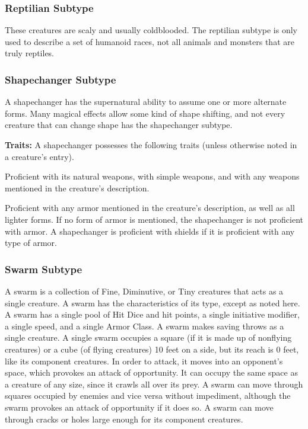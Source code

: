\subsubsection{Reptilian Subtype}
These creatures are scaly and usually coldblooded. The reptilian subtype is only used to describe a set of humanoid races, not all animals and monsters that are truly reptiles.

\subsubsection{Shapechanger Subtype}
A shapechanger has the supernatural ability to assume one or more alternate forms. Many magical effects allow some kind of shape shifting, and not every creature that can change shape has the shapechanger subtype.

\textbf{Traits:} A shapechanger possesses the following traits (unless otherwise noted in a creature's entry).
\begin{itemize*}
\item Proficient with its natural weapons, with simple weapons, and with any weapons mentioned in the creature's description.
\item Proficient with any armor mentioned in the creature's description, as well as all lighter forms. If no form of armor is mentioned, the shapechanger is not proficient with armor. A shapechanger is proficient with shields if it is proficient with any type of armor.
\end{itemize*}

\subsubsection{Swarm Subtype}
A swarm is a collection of Fine, Diminutive, or Tiny creatures that acts as a single creature. A swarm has the characteristics of its type, except as noted here. A swarm has a single pool of Hit Dice and hit points, a single initiative modifier, a single speed, and a single Armor Class. A swarm makes saving throws as a single creature. A single swarm occupies a square (if it is made up of nonflying creatures) or a cube (of flying creatures) 10 feet on a side, but its reach is 0 feet, like its component creatures. In order to attack, it moves into an opponent's space, which provokes an attack of opportunity. It can occupy the same space as a creature of any size, since it crawls all over its prey. A swarm can move through squares occupied by enemies and vice versa without impediment, although the swarm provokes an attack of opportunity if it does so. A swarm can move through cracks or holes large enough for its component creatures.

